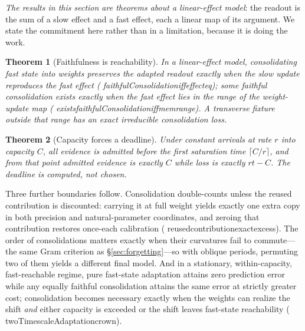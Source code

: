 \documentclass[11pt]{article}
\newtheorem{theorem}{Theorem}[section]
\newcommand{\leanname}[1]{{\scriptsize\ttfamily
  \def\_{\textunderscore\allowbreak}#1}}
\begin{document}
\emph{The results in this section are theorems about a linear-effect model}: the readout is
the sum of a slow effect and a fast effect, each a linear map of its argument. We state the
commitment here rather than in a limitation, because it is doing the work.

\begin{theorem}[Faithfulness is reachability]
In a linear-effect model, consolidating fast state into weights preserves the adapted
readout exactly when the slow update reproduces the fast effect
(\leanname{faithfulConsolidation\_iff\_effect\_eq}); some faithful consolidation exists
exactly when the fast effect lies in the range of the weight-update map
(\leanname{exists\_faithfulConsolidation\_iff\_mem\_range}). A transverse fixture outside
that range has an exact irreducible consolidation loss.
\end{theorem}

\begin{theorem}[Capacity forces a deadline]
Under constant arrivals at rate $r$ into capacity $C$, all evidence is admitted before the
first saturation time $\lceil C/r\rceil$, and from that point admitted evidence is exactly
$C$ while loss is exactly $rt-C$. The deadline is computed, not chosen.
\end{theorem}

Three further boundaries follow. Consolidation double-counts unless the reused contribution
is discounted: carrying it at full weight yields exactly one extra copy in both precision
and natural-parameter coordinates, and zeroing that contribution restores once-each
calibration (\leanname{reused\_contribution\_exact\_excess}). The order of consolidations
matters exactly when their curvatures fail to commute---the same Gram criterion as
\S\ref{sec:forgetting}---so with oblique periods, permuting two of them yields a different
final model. And in a stationary, within-capacity, fast-reachable regime, pure fast-state
adaptation attains zero prediction error while any equally faithful consolidation attains
the same error at strictly greater cost; consolidation becomes necessary exactly when the
weights can realize the shift \emph{and} either capacity is exceeded or the shift leaves
fast-state reachability (\leanname{twoTimescaleAdaptation\_crown}).
\end{document}
